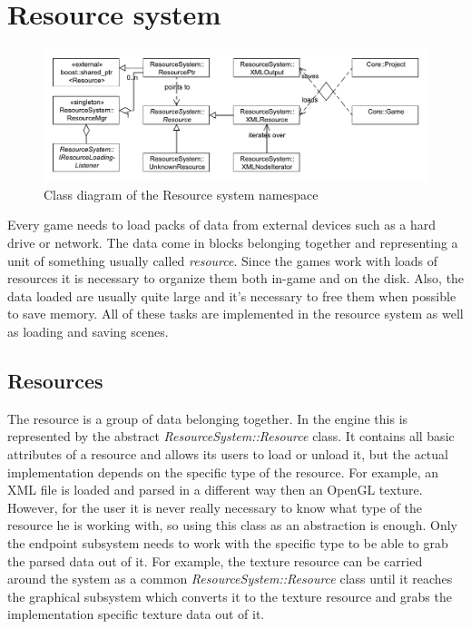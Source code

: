 \documentclass[a4paper, 12pt]{report}
\begin{document}
\chapter{Resource system}

\begin{figure}[htbp]
	\centering
		\includegraphics[width=1\textwidth]{ResourceSystemClassDiagram.pdf}
	\caption{Class diagram of the Resource system namespace}
	\label{fig:resourcesystem-diagram}
\end{figure}

Every game needs to load packs of data from external devices such as a hard drive or network. The data come in blocks belonging together and representing a unit of something usually called \emph{resource}. Since the games work with loads of resources it is necessary to organize them both in-game and on the disk. Also, the data loaded are usually quite large and it's necessary to free them when possible to save memory. All of these tasks are implemented in the resource system as well as loading and saving scenes.

\section{Resources}

The resource is a group of data belonging together. In the engine this is represented by the abstract \emph{ResourceSystem::Resource} class. It contains all basic attributes of a resource and allows its users to load or unload it, but the actual implementation depends on the specific type of the resource. For example, an XML file is loaded and parsed in a different way then an OpenGL texture. However, for the user it is never really necessary to know what type of the resource he is working with, so using this class as an abstraction is enough. Only the endpoint subsystem needs to work with the specific type to be able to grab the parsed data out of it. For example, the texture resource can be carried around the system as a common \emph{ResourceSystem::Resource} class until it reaches the graphical subsystem which converts it to the texture resource and grabs the implementation specific texture data out of it.
\end{document}
